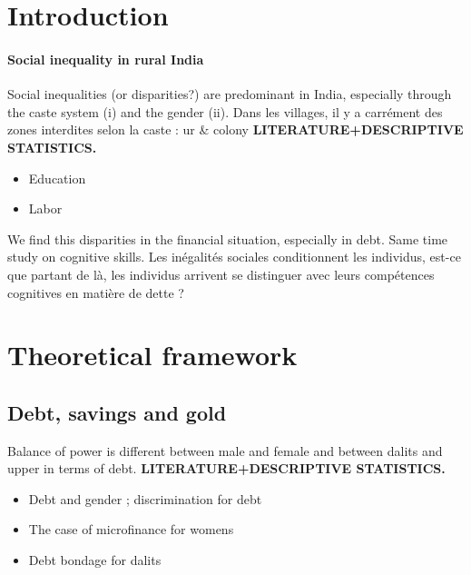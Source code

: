 \documentclass[a4paper, 11pt, onecolumn]{article}
\begin{document}
\newpage
\section{Introduction}


\paragraph{Social inequality in rural India}

Social inequalities (or disparities?) are predominant in India, especially through the caste system (i) and the gender (ii).
Dans les villages, il y a carrément des zones interdites selon la caste : ur \& colony
\textbf{LITERATURE+DESCRIPTIVE STATISTICS.}
\begin{itemize}
\item Education
\item Labor
\end{itemize}
	
We find this disparities in the financial situation, especially in debt.
Same time study on cognitive skills.
Les inégalités sociales conditionnent les individus, est-ce que partant de là, les individus arrivent se distinguer avec leurs compétences cognitives en matière de dette ?



\newpage
\section{Theoretical framework}

	
	\subsection{Debt, savings and gold}
	
	Balance of power is different between male and female and between dalits and upper in terms of debt.
	\textbf{LITERATURE+DESCRIPTIVE STATISTICS.}
	\begin{itemize}
	\item Debt and gender \citep{Reboul2021}; discrimination for debt \citep{Guerin2013a}
	\item The case of microfinance for womens \citep{Guerin2020b}
	\item Debt bondage for dalits \citep{Guerin2020a}
	\end{itemize}
	
\end{document}
